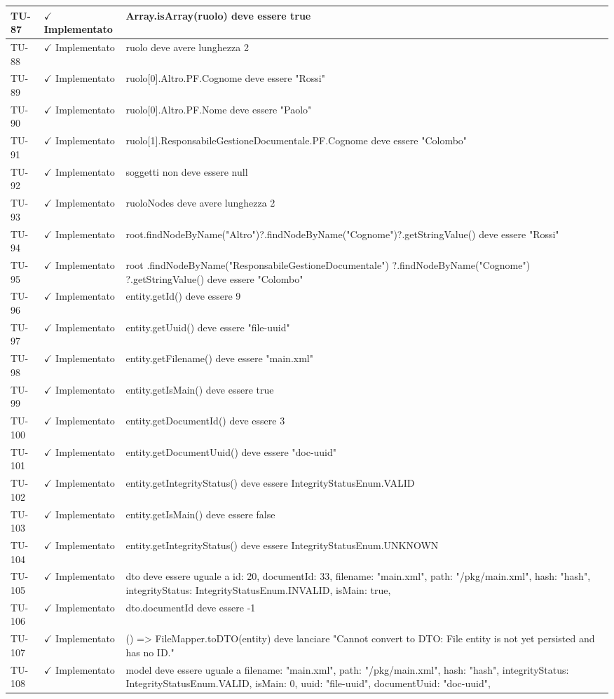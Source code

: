 ﻿\documentclass[a4paper,12pt]{article}
\newcommand{\ok}{\textcolor{green!60!black}{$\checkmark$ Implementato}}
\begin{document}
\begin{longtable}{|p{2cm}|p{3.5cm}|p{9.5cm}|}
\hline
TU-87 & \ok & Array.isArray(ruolo) deve essere true \\
\hline
TU-88 & \ok & ruolo deve avere lunghezza 2 \\
\hline
TU-89 & \ok & ruolo[0].Altro.PF.Cognome deve essere "Rossi" \\
\hline
TU-90 & \ok & ruolo[0].Altro.PF.Nome deve essere "Paolo" \\
\hline
TU-91 & \ok & ruolo[1].ResponsabileGestioneDocumentale.PF.Cognome deve essere "Colombo" \\
\hline
TU-92 & \ok & soggetti non deve essere null \\
\hline
TU-93 & \ok & ruoloNodes deve avere lunghezza 2 \\
\hline
TU-94 & \ok & root.findNodeByName("Altro")?.findNodeByName("Cognome")?.getStringValue() deve essere "Rossi" \\
\hline
TU-95 & \ok & root .findNodeByName("ResponsabileGestioneDocumentale") ?.findNodeByName("Cognome") ?.getStringValue() deve essere "Colombo" \\
\hline
TU-96 & \ok & entity.getId() deve essere 9 \\
\hline
TU-97 & \ok & entity.getUuid() deve essere "file-uuid" \\
\hline
TU-98 & \ok & entity.getFilename() deve essere "main.xml" \\
\hline
TU-99 & \ok & entity.getIsMain() deve essere true \\
\hline
TU-100 & \ok & entity.getDocumentId() deve essere 3 \\
\hline
TU-101 & \ok & entity.getDocumentUuid() deve essere "doc-uuid" \\
\hline
TU-102 & \ok & entity.getIntegrityStatus() deve essere IntegrityStatusEnum.VALID \\
\hline
TU-103 & \ok & entity.getIsMain() deve essere false \\
\hline
TU-104 & \ok & entity.getIntegrityStatus() deve essere IntegrityStatusEnum.UNKNOWN \\
\hline
TU-105 & \ok & dto deve essere uguale a { id: 20, documentId: 33, filename: "main.xml", path: "/pkg/main.xml", hash: "hash", integrityStatus: IntegrityStatusEnum.INVALID, isMain: true, } \\
\hline
TU-106 & \ok & dto.documentId deve essere -1 \\
\hline
TU-107 & \ok & () => FileMapper.toDTO(entity) deve lanciare "Cannot convert to DTO: File entity is not yet persisted and has no ID." \\
\hline
TU-108 & \ok & model deve essere uguale a { filename: "main.xml", path: "/pkg/main.xml", hash: "hash", integrityStatus: IntegrityStatusEnum.VALID, isMain: 0, uuid: "file-uuid", documentUuid: "doc-uuid", } \\

\end{longtable}
\end{document}
